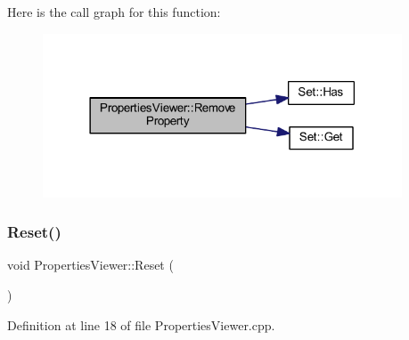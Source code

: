 Here is the call graph for this function\+:
\nopagebreak
\begin{figure}[H]
\begin{center}
\leavevmode
\includegraphics[width=302pt]{class_properties_viewer_a17827ffbcf53b5dc5cd2d0873d2bf2e7_cgraph}
\end{center}
\end{figure}
\mbox{\label{class_properties_viewer_a610dc708815ecdc748c2898551f086c0}} 
\subsubsection{\texorpdfstring{Reset()}{Reset()}}
{\footnotesize\ttfamily void Properties\+Viewer\+::\+Reset (\begin{DoxyParamCaption}{ }\end{DoxyParamCaption})}



Definition at line 18 of file Properties\+Viewer.\+cpp.

